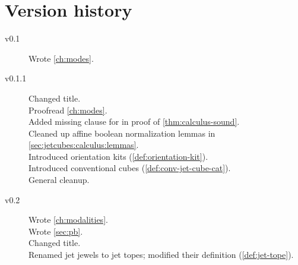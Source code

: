 \documentclass[a4paper]{memoir}
\begin{document}
\chapter{Version history}
\begin{description}
	\item[v0.1] Wrote \cref{ch:modes}.
	\item[v0.1.1] Changed title. \\
		Proofread \cref{ch:modes}. \\
		Added missing clause for  in proof of \cref{thm:calculus-sound}. \\
		Cleaned up affine boolean normalization lemmas in \cref{sec:jetcubes:calculus:lemmas}. \\
		Introduced orientation kits (\cref{def:orientation-kit}). \\
		Introduced conventional cubes (\cref{def:conv-jet-cube-cat}). \\
		General cleanup.
	\item[v0.2] Wrote \cref{ch:modalities}. \\
		Wrote \cref{sec:pb}. \\
		Changed title. \\
		Renamed jet jewels to jet topes; modified their definition (\cref{def:jet-tope}).
\end{description}



\end{document}
